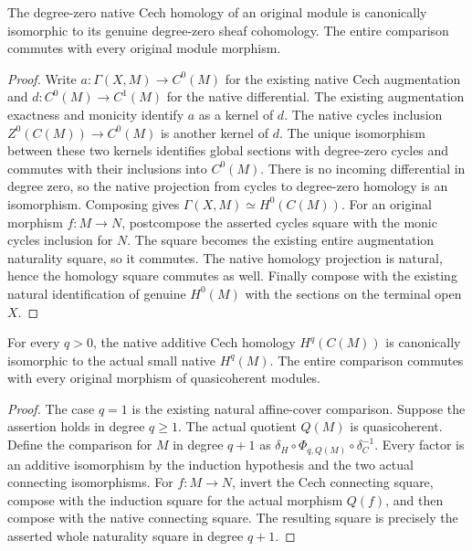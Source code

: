 \begin{lemma}
\label{lem:scheme-module-cech-native-zero}
\leanok
{}
The degree-zero native Cech homology of an original module is
canonically isomorphic to its genuine degree-zero sheaf cohomology.
The entire comparison commutes with every original module morphism.
\end{lemma}
\begin{proof}
Write $a:\Gamma(X,M)\to C^0(M)$ for the existing native Cech
augmentation and $d:C^0(M)\to C^1(M)$ for the native differential.
The existing augmentation exactness and monicity identify $a$ as a
kernel of $d$. The native cycles inclusion $Z^0(C(M))\to C^0(M)$
is another kernel of $d$. The unique isomorphism between these two
kernels identifies global sections with degree-zero cycles and
commutes with their inclusions into $C^0(M)$. There is no incoming
differential in degree zero, so the native projection from cycles
to degree-zero homology is an isomorphism. Composing gives
$\Gamma(X,M)\simeq H^0(C(M))$. For an original morphism $f:M\to N$,
postcompose the asserted cycles square with the monic cycles
inclusion for $N$. The square becomes the existing entire
augmentation naturality square, so it commutes. The native homology
projection is natural, hence the homology square commutes as well.
Finally compose with the existing natural identification of genuine
$H^0(M)$ with the sections on the terminal open $X$.
\end{proof}

\begin{theorem}
\label{thm:scheme-module-cech-native-positive-comparison}
\leanok
{}
For every $q>0$, the native additive Cech homology $H^q(C(M))$ is
canonically isomorphic to the actual small native $H^q(M)$. The
entire comparison commutes with every original morphism of
quasicoherent modules.
\end{theorem}
\begin{proof}
The case $q=1$ is the existing natural affine-cover comparison.
Suppose the assertion holds in degree $q\geq1$. The actual quotient
$Q(M)$ is quasicoherent. Define the comparison for $M$ in degree
$q+1$ as $\delta_H\circ\Phi_{q,Q(M)}\circ\delta_C^{-1}$.
Every factor is an additive isomorphism by the induction hypothesis
and the two actual connecting isomorphisms. For $f:M\to N$, invert
the Cech connecting square, compose with the induction square for
the actual morphism $Q(f)$, and then compose with the native
connecting square. The resulting square is precisely the asserted
whole naturality square in degree $q+1$.
\end{proof}

